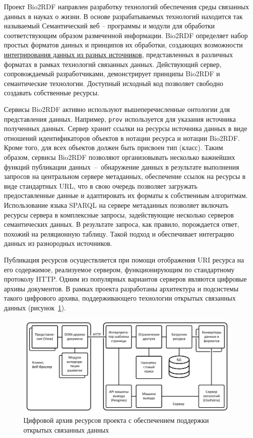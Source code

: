 \documentclass[a4paper,12pt,openany,final]{extreport}
\def\oldcaption{} \let\oldcaption=\caption
\def\caption{\stepcounter{captionsnum}\oldcaption}
\begin{document}
Проект Bio2RDF направлен разработку технологий обеспечения среды связанных данных в науках о жизни. В основе разрабатываемых технологий находится так называемый Семантический веб -- программы и модули для обработки соответствующим образом размеченной информации. Bio2RDF определяет набор простых форматов данных и принципов их обработки, создающих возможности \href{https://docs.google.com/presentation/d/1SG6PFew2CPK1o_jRCYx30DFnuGEEr0uWVKPnz7Uqw5k/pub?start=false\&loop=false\&delayms=3000\&slide=id.p}{интегрирования данных из разных источников}, представленных в различных форматах в рамках технологий связанных данных. Действующий сервер, сопровождаемый разработчиками, демонстрирует принципы Bio2RDF и семантические технологии. Доступный исходный код позволяет свободно создавать собственные ресурсы.

Сервисы Bio2RDF активно используют вышеперечисленные онтологии для представления данных. Например, \texttt{prov} используется для указания источника полученных данных. Сервер хранит ссылки на ресурсы источника данных в виде отношений идентификаторов объектов в нотации ресурса и нотации Bio2RDF. Кроме того, для всех объектов должен быть присвоен тип (класс).  Таким образом, сервисы Bio2RDF позволяют организовывать несколько важнейших функций публикации данных~--~обнаружение данных в результате выполнения запросов на центральном сервере метаданных, обеспечение ссылок на ресурсы в виде стандартных URL, что в свою очередь позволяет загружать предоставленные данные и адаптировать их форматы к собственным алгоритмам. Использование языка SPARQL на сервере метаданных позволяет включать ресурсы сервера в комплексные запросы, задействующие несколько серверов семантических данных. В результате запроса, как правило, порождается ответ, похожий на реляционную таблицу. Такой подход и обеспечивает интеграцию данных из разнородных источников.

Публикация ресурсов осуществляется при помощи отображения URI ресурса на его содержимое, реализуемое сервером, функционирующим по стандартному протоколу HTTP.  Одним из популярных вариантов серверов являются цифровые архивы документов. В рамках проекта разработаны архитектура и подсистемы такого цифрового архива, поддерживающего технологии открытых связанных данных (рисунок~\ref{fig:digital}).

\begin{figure}\centering
\includegraphics[width=0.8\linewidth]{media/image18.png}

\caption{Цифровой архив ресурсов проекта с обеспечением поддержки открытых связанных данных}\label{fig:digital}
\end{figure}
\end{document}
